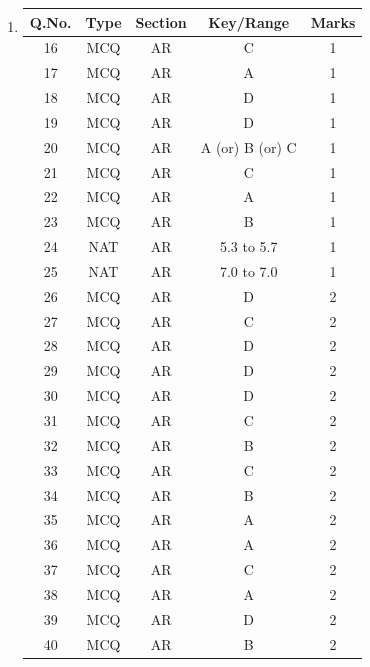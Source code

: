\documentclass[journal,15pt,onecolumn]{IEEEtran}
\theoremstyle{remark}
\begin{document}
\begin{enumerate}
\renewcommand{\arraystretch}{2.2} %
\setlength{\tabcolsep}{20pt} %
\item
\begin{tabular}{|c|c|c|c|c|}
\hline
\rowcolor{orange!30}
Q.No. & Type & Section & Key/Range & Marks \\
\hline
16 & MCQ & AR & C & 1 \\
\hline
17 & MCQ & AR & A & 1 \\
\hline
18 & MCQ & AR & D & 1 \\
\hline
19 & MCQ & AR & D & 1 \\
\hline
20 & MCQ & AR & A (or) B (or) C & 1 \\
\hline
21 & MCQ & AR & C & 1 \\
\hline
22 & MCQ & AR & A & 1 \\
\hline
23 & MCQ & AR & B & 1 \\
\hline
24 & NAT & AR & 5.3 to 5.7 & 1 \\
\hline
25 & NAT & AR & 7.0 to 7.0 & 1 \\
\hline
26 & MCQ & AR & D & 2 \\
\hline
27 & MCQ & AR & C & 2 \\
\hline
28 & MCQ & AR & D & 2 \\
\hline
29 & MCQ & AR & D & 2 \\
\hline
30 & MCQ & AR & D & 2 \\
\hline
31 & MCQ & AR & C & 2 \\
\hline
32 & MCQ & AR & B & 2 \\
\hline
33 & MCQ & AR & C & 2 \\
\hline
34 & MCQ & AR & B & 2 \\
\hline
35 & MCQ & AR & A & 2 \\
\hline
36 & MCQ & AR & A & 2 \\
\hline
37 & MCQ & AR & C & 2 \\
\hline
38 & MCQ & AR & A & 2 \\
\hline
39 & MCQ & AR & D & 2 \\
\hline
40 & MCQ & AR & B & 2 \\
\hline
\end{tabular}




\end{enumerate}
\end{document}
